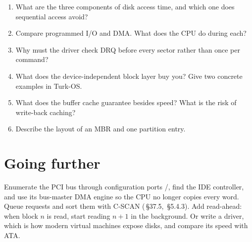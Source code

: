 \documentclass[11pt,a4paper]{article}
\begin{document}
\begin{questionbox}
\begin{enumerate}
  \item What are the three components of disk access time, and which one does sequential access avoid?
  \item Compare programmed I/O and DMA. What does the CPU do during each?
  \item Why must the driver check DRQ before every sector rather than once per command?
  \item What does the device-independent block layer buy you? Give two concrete examples in Turk-OS.
  \item What does the buffer cache guarantee besides speed? What is the risk of write-back caching?
  \item Describe the layout of an MBR and one partition entry.
\end{enumerate}
\end{questionbox}

\section{Going further}

Enumerate the PCI bus through configuration ports /, find the IDE controller, and use its
bus-master DMA engine so the CPU no longer copies every word. Queue requests and sort them with C-SCAN
(\OSTEP\,\S37.5, \MOS\,\S5.4.3). Add read-ahead: when block $n$ is read, start reading $n+1$ in the background. Or write
a  driver, which is how modern virtual machines expose disks, and compare its speed with ATA.

\booklegend
\end{document}
